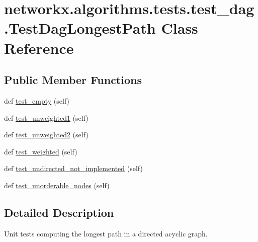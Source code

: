 \hypertarget{classnetworkx_1_1algorithms_1_1tests_1_1test__dag_1_1TestDagLongestPath}{}\section{networkx.\+algorithms.\+tests.\+test\+\_\+dag.\+Test\+Dag\+Longest\+Path Class Reference}
\label{classnetworkx_1_1algorithms_1_1tests_1_1test__dag_1_1TestDagLongestPath}
\subsection*{Public Member Functions}
\begin{DoxyCompactItemize}
\item 
def \hyperlink{classnetworkx_1_1algorithms_1_1tests_1_1test__dag_1_1TestDagLongestPath_aa65e3daa8d15d3950d021f2201cc3682}{test\+\_\+empty} (self)
\item 
def \hyperlink{classnetworkx_1_1algorithms_1_1tests_1_1test__dag_1_1TestDagLongestPath_aae7804ea335b6f9187869833fc366ce0}{test\+\_\+unweighted1} (self)
\item 
def \hyperlink{classnetworkx_1_1algorithms_1_1tests_1_1test__dag_1_1TestDagLongestPath_a1efc78abd1ebeba62bf68973c5dd7aa8}{test\+\_\+unweighted2} (self)
\item 
def \hyperlink{classnetworkx_1_1algorithms_1_1tests_1_1test__dag_1_1TestDagLongestPath_ae9a64de6fbd0c0030aa52d5099bf98c3}{test\+\_\+weighted} (self)
\item 
def \hyperlink{classnetworkx_1_1algorithms_1_1tests_1_1test__dag_1_1TestDagLongestPath_a302bc78116d72ccaa9d3544df1adb946}{test\+\_\+undirected\+\_\+not\+\_\+implemented} (self)
\item 
def \hyperlink{classnetworkx_1_1algorithms_1_1tests_1_1test__dag_1_1TestDagLongestPath_a4ce7dd4a14f01b592bcc156b2a90a3a9}{test\+\_\+unorderable\+\_\+nodes} (self)
\end{DoxyCompactItemize}


\subsection{Detailed Description}
\begin{DoxyVerb}Unit tests computing the longest path in a directed acyclic graph.\end{DoxyVerb}
 

